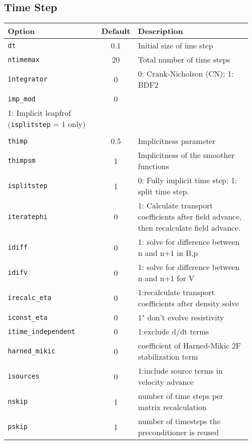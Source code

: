 \begin{tabular}{lcp{4.0in}}
\end{tabular}



\subsection{Time Step}
\begin{tabular}{lcp{4in}}
  \textbf{Option}&\textbf{Default}&\textbf{Description}\\
  \hline
  \texttt{dt}         & 0.1 & Initial size of ime step\\
  \texttt{ntimemax}   & 20  & Total number of time steps\\
  \texttt{integrator} & 0   & 0: Crank-Nicholson (CN); 1: BDF2\\
  \texttt{imp\_mod}   & 0   & 
  \begin{minipage}[t]{4in}
    0: $\theta$-implicit\\
    1: Implicit leapfrof (\texttt{isplitstep} = 1 only)\\
  \end{minipage}\\
  \texttt{thimp}      & 0.5 & Implicitness parameter\\
  \texttt{thimpsm}    & 1   & Implicitness of the smoother functions\\
  \texttt{isplitstep} & 1   & 0: Fully implicit time step; 
                              1: split time step.\\
  \texttt{iteratephi} & 0   & 1: Calculate transport coefficients after
    field advance, then recalculate field advance. \\
  \texttt{idiff} & 0 & 1: solve for difference between n and n+1 in B,p \\
  \texttt{idifv} & 0 & 1: solve for difference between n and n+1 for V \\
  \texttt{irecalc\_eta} & 0 & 1:recalculate transport coefficients after density solve \\
  \texttt{iconst\_eta}  & 0 & 1" don't evolve resistivity \\
  \texttt{itime\_independent} & 0 & 1:exclude d/dt terms \\
  \texttt{harned\_mikic}  & 0 & coefficient of Harned-Mikic 2F stabilization term \\
  \texttt{isources}       & 0 & 1:include source terms in velocity advance \\
  \texttt{nskip}   & 1 & number of time steps per matrix recalculation \\
  \texttt{pskip}   & 1 & number of timesteps the preconditioner is reused \\

\end{tabular}
